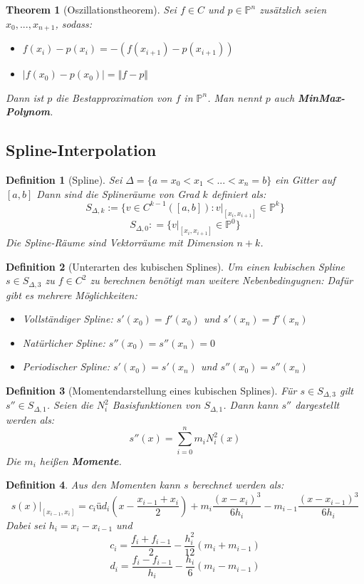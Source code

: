 \documentclass[10pt,a4paper]{article}
\newtheorem{theorem}{Theorem}
\newtheorem{definition}{Definition}
\begin{document}
	\begin{theorem}[Oszillationstheorem]
		Sei $f\in C$ und $p\in \mathbb{P}^n$ zusätzlich seien $x_0, ...,x_{n+1}$, sodass:
		\begin{itemize}
			\item $f(x_i)-p(x_i) = - (f(x_{i+1})-p(x_{i+1}))$
			\item $|f(x_0)-p(x_0)| = \Vert f-p\Vert$
		\end{itemize}
		Dann ist $p$ die Bestapproximation von $f$ in $\mathbb{P}^n$. Man nennt $p$ auch \textbf{MinMax-Polynom}.
	\end{theorem}
	\subsection{Spline-Interpolation}
	\begin{definition}[Spline]
		Sei $\Delta = \{a=x_0 < x_1 < ... < x_n = b\}$ ein Gitter auf $[a, b]$ Dann sind die Splineräume von Grad $k$ definiert als:
		$$S_{\Delta, k} := \{v\in C^{k-1}([a, b]) : v|_{[x_i, x_{i+1}]}\in \mathbb{P}^k\}$$
		$$S_{\Delta, 0} : = \{v|_{[x_i, x_{i+1}]} \in \mathbb{P}^0\}$$
		Die Spline-Räume sind Vektorräume mit Dimension $n+k$.
	\end{definition}
	\begin{definition}[Unterarten des kubischen Splines]
		Um einen kubischen Spline $s\in S_{\Delta, 3}$ zu $f\in C^2$ zu berechnen benötigt man weitere Nebenbedingugnen:
		Dafür gibt es mehrere Möglichkeiten:
		\begin{itemize}
			\item Vollständiger Spline: $s'(x_0) = f'(x_0)$ und $s'(x_n) = f'(x_n)$
			\item Natürlicher Spline: $s''(x_0) = s''(x_n) = 0$
			\item Periodischer Spline: $s'(x_0) = s'(x_n)$ und $s''(x_0) = s''(x_n)$
		\end{itemize}
	\end{definition}
	\begin{definition}[Momentendarstellung eines kubischen Splines]
		Für $s \in S_{\Delta, 3}$ gilt $s'' \in S_{\Delta, 1}$. Seien die $N_i^2$ Basisfunktionen von $S_{\Delta, 1}$. Dann kann $s''$ dargestellt werden als:
		$$s''(x) = \sum_{i=0}^{n}m_iN_i^2(x)$$
		Die $m_i$ heißen \textbf{Momente}.
	\end{definition}
	\begin{definition}
		Aus den Momenten kann $s$ berechnet werden als:
		$$s(x)|_{[x_{i-1}, x_i]} = c_i ü d_i(x-\frac{x_{i-1}+x_i}{2}) +m_i\frac{(x-x_{i})^3}{6h_i} - m_{i-1}\frac{(x-x_{i-1})^3}{6h_i}$$
		Dabei sei $h_i = x_i -x_{i-1}$ und 
		$$c_i = \frac{f_i+f_{i-1}}{2}-\frac{h_i^2}{12}(m_i+m_{i-1})$$
		$$d_i = \frac{f_i-f_{i-1}}{h_i}-\frac{h_i}{6}(m_i-m_{i-1})$$
	\end{definition}
\end{document}
